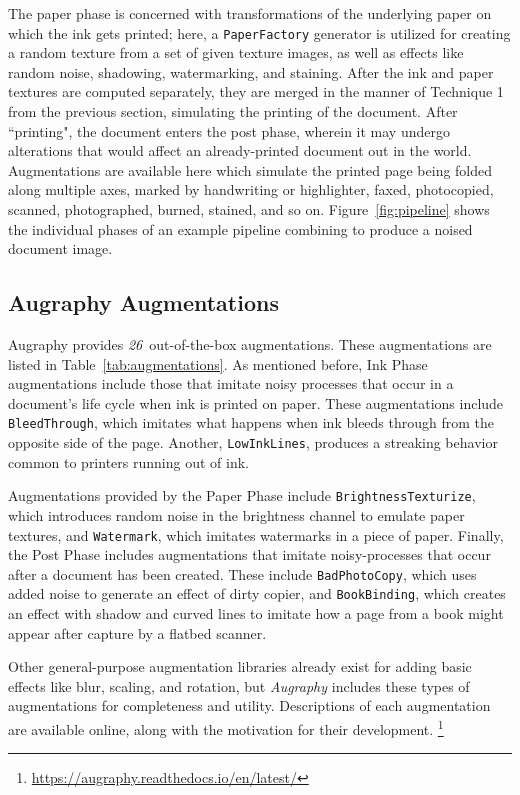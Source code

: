 \documentclass[runningheads]{llncs}
\newcommand{\numAugraphyAugmentations}{\emph{26}}
\begin{document}
The paper phase is concerned with transformations of the underlying paper on which the ink gets printed; here, a \texttt{PaperFactory} generator is utilized for creating a random texture from a set of given texture images, as well as effects like random noise, shadowing, watermarking, and staining.
After the ink and paper textures are computed separately, they are merged in the manner of Technique 1 from the previous section, simulating the printing of the document.
After ``printing", the document enters the post phase, wherein it may undergo alterations that would affect an already-printed document out in the world.
Augmentations are available here which simulate the printed page being folded along multiple axes, marked by handwriting or highlighter, faxed, photocopied, scanned, photographed, burned, stained, and so on.
Figure~\ref{fig:pipeline} shows the individual phases of an example pipeline combining to produce a noised document image.

\subsection{Augraphy Augmentations}

Augraphy provides \numAugraphyAugmentations ~out-of-the-box augmentations.
These augmentations are listed in Table~\ref{tab:augmentations}.
As mentioned before, Ink Phase augmentations include those that imitate noisy processes that occur in a document's life cycle when ink is printed on paper.
These augmentations include \texttt{BleedThrough}, which imitates what happens when ink bleeds through from the opposite side of the page.
Another, \texttt{LowInkLines}, produces a streaking behavior common to printers running out of ink.

Augmentations provided by the Paper Phase include \texttt{BrightnessTexturize}, which introduces random noise in the brightness channel to emulate paper textures, and \texttt{Watermark}, which imitates watermarks in a piece of paper.
Finally, the Post Phase includes augmentations that imitate noisy-processes that occur after a document has been created.
These include \texttt{BadPhotoCopy}, which uses added noise to generate an effect of dirty copier, and \texttt{BookBinding}, which creates an effect with shadow and curved lines to imitate how a page from a book might appear after capture by a flatbed scanner.

Other general-purpose augmentation libraries already exist for adding basic effects like blur, scaling, and rotation, but \emph{Augraphy} includes these types of augmentations for completeness and utility.
Descriptions of each augmentation are available online, along with the motivation for their development. \footnote{\url{https://augraphy.readthedocs.io/en/latest/}}
\end{document}
